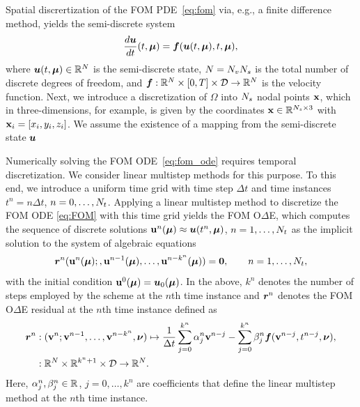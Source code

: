 \documentclass[3p,computermodern,10pt]{elsarticle}
\begin{document}
Spatial discrertization of the FOM PDE~\eqref{eq:fom} via, e.g., a finite difference method, yields the semi-discrete system  
\begin{equation}\label{eq:fom_ode}
\frac{d \boldsymbol u}{dt}(t,\boldsymbol \mu) = \boldsymbol f(\boldsymbol u(t,\boldsymbol \mu),t,\boldsymbol \mu),
\end{equation}
where $\boldsymbol u(t,\boldsymbol \mu) \in \mathbb{R}^{N}$ is the semi-discrete state, $N = N_v N_s$ is the total number of discrete degrees of freedom, and $\boldsymbol f: \mathbb{R}^{N} \times [0,T] \times \mathcal{D} \rightarrow \mathbb{R}^{N}$ is the velocity function. Next, we introduce a discretization of $\Omega$ into $N_s$ nodal points $\mathbf{x}$, which in three-dimensions, for example, is given by the coordinates $\mathbf{x} \in \mathbb{R}^{N_s \times 3}$ with $\mathbf{x}_i = \left[x_i,y_i,z_i\right]$. We assume the existence of a mapping from the semi-discrete state $\boldsymbol u$ 

Numerically solving the FOM ODE~\eqref{eq:fom_ode} requires temporal discretization. We consider linear multistep methods for this purpose. 
To this end, we introduce a uniform time
grid with time step $\Delta t$ and time instances
$t^n = n\Delta
t$, $n=0,\ldots,N_t$. 
Applying a linear multistep method to discretize the FOM ODE \eqref{eq:FOM}
with this time grid
yields the FOM O$\Delta$E, which computes the sequence of discrete
solutions
$\mathbf{u}^n(\boldsymbol \mu) \approx \boldsymbol u(t^n,\boldsymbol \mu)$, $n=1,\ldots,N_t$
as the implicit solution to the system of algebraic equations
\begin{equation}\label{eq:lms}
\boldsymbol{r}^n
	(\mathbf{u}^n(\boldsymbol \mu);,\mathbf{u}^{n-1}(\boldsymbol \mu),\ldots,\mathbf{u}^{n-k^n}(\boldsymbol \mu))
	= \boldsymbol 0,\qquad n=1,\ldots,N_t,
\end{equation}
with the initial condition $\mathbf{u}^0(\boldsymbol \mu) =\boldsymbol u_0(\boldsymbol \mu)$. In the above, $k^n$ denotes the number of steps employed by the scheme at the $n$th
time instance and 
$\boldsymbol{r}^n$ denotes the FOM O$\Delta$E residual at the $n$th time instance defined as
\begin{align*}
\boldsymbol{r}^n &: (\mathbf{v}^n;\mathbf{v}^{n-1},\ldots,\mathbf{v}^{n-k^n},\boldsymbol \nu) \mapsto  \frac{1}{\Delta t} \sum_{j=0}^{k^n} \alpha^n_j \mathbf{v}^{n-j} -  \sum_{j=0}^{k^n} \beta^n_j \boldsymbol f(\mathbf{v}^{n-j},t^{n-j},\boldsymbol \nu),
\\
&: \mathbb{R}^{N} \times \mathbb{R}^{k^n + 1} \times \mathcal{D} \rightarrow \mathbb{R}^{N}.
\end{align*} 
Here, $\alpha^n_j,\beta^n_j\in\mathbb{R}^{}$, $j=0,\ldots,k^n$ are coefficients
that define the linear multistep method at the $n$th time instance.
\end{document}
